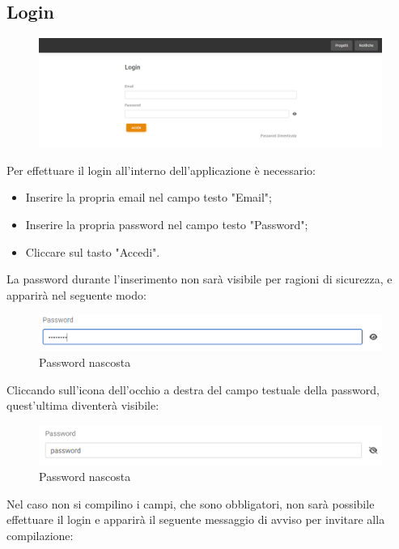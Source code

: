 \documentclass{article}
\begin{document}
\subsection{Login}
 \begin{figure}[H]
      \centering
      \includegraphics[width=\textwidth]{documenti/Screenshot manuale utente/pagina login.png}
      \label{login}
    \end{figure} 
Per effettuare il login all'interno dell'applicazione è necessario:
\begin{itemize}
    \item Inserire la propria email nel campo testo "Email";
    \item Inserire la propria password nel campo testo "Password";
    \item Cliccare sul tasto "Accedi".
\end{itemize}
La password durante l'inserimento non sarà visibile per ragioni di sicurezza, e apparirà nel seguente modo:
\begin{figure}[H]
      \centering
      \includegraphics[width=\textwidth]{documenti/Screenshot manuale utente/password non visibile.png}
      \caption{Password nascosta}
      \label{passnascosta}
    \end{figure} 
Cliccando sull'icona dell'occhio a destra del campo testuale della password, quest'ultima diventerà visibile:
\begin{figure}[H]
      \centering
      \includegraphics[width=\textwidth]{documenti/Screenshot manuale utente/password visibile.png}
      \caption{Password nascosta}
      \label{passvisibile}
    \end{figure}
Nel caso non si compilino i campi, che sono obbligatori, non sarà possibile effettuare il login e apparirà il seguente messaggio di avviso per invitare alla compilazione:
\end{document}
